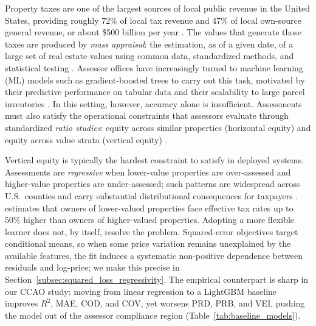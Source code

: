 \documentclass[12pt]{article}
\theoremstyle{plain}
\theoremstyle{definition}
\newcommand{\1}{\mathbf{1}}
\begin{document}
Property taxes are one of the largest sources of local public revenue in the United States, providing roughly 72\% of local tax revenue and 47\% of local own-source general revenue, or about \$500 billion per year \cite{Berry2021}. The values that generate those taxes are produced by \emph{mass appraisal}: the estimation, as of a given date, of a large set of real estate values using common data, standardized methods, and statistical testing \cite{IAAO2025Mass}. Assessor offices have increasingly turned to machine learning (ML) models such as gradient-boosted trees to carry out this task, motivated by their predictive performance on tabular data and their scalability to large parcel inventories \cite{IAAOAITaskForce2022,BidansetRakow2022,Rootetal2023,Sevgen2024100111,Zilli2024}. In this setting, however, accuracy alone is insufficient. Assessments must also satisfy the operational constraints that assessors evaluate through standardized \emph{ratio studies}: equity across similar properties (horizontal equity) and equity across value strata (vertical equity) \cite{Quintos2014,10578d49-78f8-3ef9-8277-9b6add2bd071,IAAO2013Ratio,IAAO2025ExposureRatio}.

Vertical equity is typically the hardest constraint to satisfy in deployed systems. Assessments are \emph{regressive} when lower-value properties are over-assessed and higher-value properties are under-assessed; such patterns are widespread across U.S.\ counties and carry substantial distributional consequences for taxpayers \cite{McMillen2020,Berry2021,IAAO2023VerticalReview,McMillenSingh2023}. \textcite{amornsiripanitch2020why} estimates that owners of lower-valued properties face effective tax rates up to 50\% higher than owners of higher-valued properties. Adopting a more flexible learner does not, by itself, resolve the problem. Squared-error objectives target conditional means, so when some price variation remains unexplained by the available features, the fit induces a systematic non-positive dependence between residuals and log-price; we make this precise in Section~\ref{subsec:squared_loss_regressivity}. The empirical counterpart is sharp in our CCAO study: moving from linear regression to a LightGBM baseline improves $R^2$, MAE, COD, and COV, yet worsens PRD, PRB, and VEI, pushing the model out of the assessor compliance region (Table~\ref{tab:baseline_models}).
\end{document}
